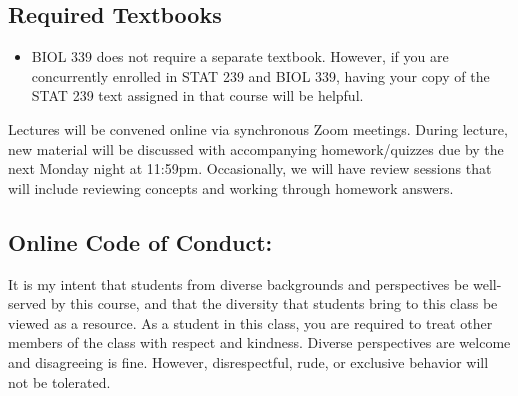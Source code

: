 \documentclass{tufte-handout}
\begin{document}
\begin{fullwidth}
\subsection{Required Textbooks}

\begin{itemize}
	\item BIOL 339 does not require a separate textbook. However, if you are concurrently enrolled in STAT 239 and BIOL 339, having your copy of the STAT 239 text assigned in that course will be helpful.
\end{itemize}




 Lectures will be convened online via synchronous Zoom meetings. During lecture, new material will be discussed with accompanying homework/quizzes due by the next Monday night at 11:59pm. Occasionally, we will have review sessions that will include reviewing concepts and working through homework answers. 





\subsection{Online Code of Conduct: } 

It is my intent that students from diverse backgrounds and perspectives be well-served by this course, and that the diversity that students bring to this class be viewed as a resource. As a student in this class, you are required to treat other members of the class with respect and kindness. Diverse perspectives are welcome and disagreeing is fine. However, disrespectful, rude, or exclusive behavior will not be tolerated. 


\end{fullwidth}

\end{document}

